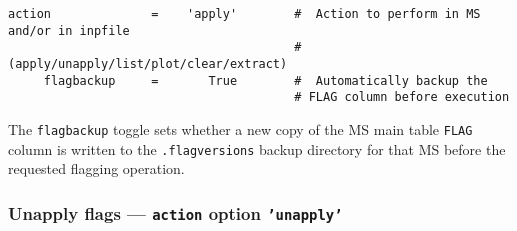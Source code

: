 \small
\begin{verbatim}
action              =    'apply'        #  Action to perform in MS and/or in inpfile
                                        #   (apply/unapply/list/plot/clear/extract)
     flagbackup     =       True        #  Automatically backup the
                                        # FLAG column before execution

\end{verbatim}
\normalsize
%
%

The {\tt flagbackup} toggle sets whether a new copy of the MS main
table {\tt FLAG} column is written to the {\tt .flagversions} backup
directory for that MS before the requested flagging operation.


\subsubsection{Unapply flags --- {\tt action} option {\tt 'unapply'}}
\label{section:edit.flagcmd.action.unapply}

